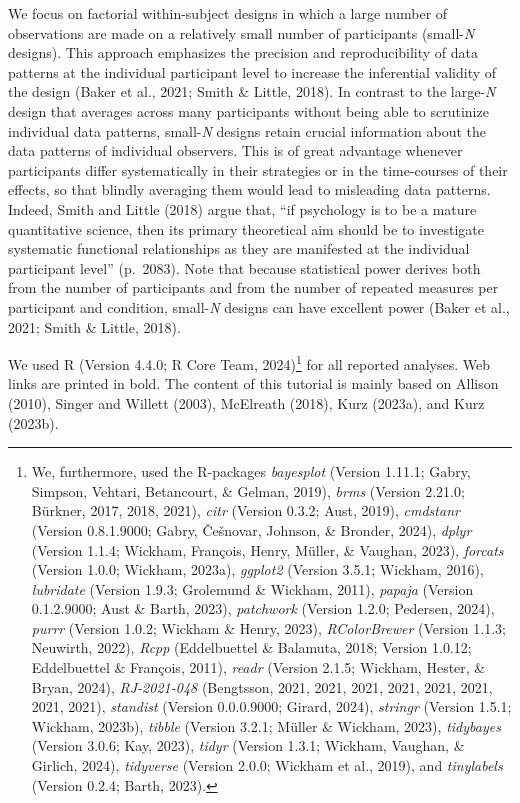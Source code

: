 \documentclass[
  man,floatsintext]{apa6}
\begin{document}
We focus on factorial within-subject designs in which a large number of observations are made on a relatively small number of participants (small-\emph{N} designs). This approach emphasizes the precision and reproducibility of data patterns at the individual participant level to increase the inferential validity of the design (Baker et al., 2021; Smith \& Little, 2018). In contrast to the large-\emph{N} design that averages across many participants without being able to scrutinize individual data patterns, small-\emph{N} designs retain crucial information about the data patterns of individual observers. This is of great advantage whenever participants differ systematically in their strategies or in the time-courses of their effects, so that blindly averaging them would lead to misleading data patterns. Indeed, Smith and Little (2018) argue that, ``if psychology is to be a mature quantitative science, then its primary theoretical aim should be to investigate systematic functional relationships as they are manifested at the individual participant level'' (p.~2083). Note that because statistical power derives both from the number of participants and from the number of repeated measures per participant and condition, small-\emph{N} designs can have excellent power (Baker et al., 2021; Smith \& Little, 2018).

We used R (Version 4.4.0; R Core Team, 2024)\footnote{We, furthermore, used the R-packages \emph{bayesplot} (Version 1.11.1; Gabry, Simpson, Vehtari, Betancourt, \& Gelman, 2019), \emph{brms} (Version 2.21.0; Bürkner, 2017, 2018, 2021), \emph{citr} (Version 0.3.2; Aust, 2019), \emph{cmdstanr} (Version 0.8.1.9000; Gabry, Češnovar, Johnson, \& Bronder, 2024), \emph{dplyr} (Version 1.1.4; Wickham, François, Henry, Müller, \& Vaughan, 2023), \emph{forcats} (Version 1.0.0; Wickham, 2023a), \emph{ggplot2} (Version 3.5.1; Wickham, 2016), \emph{lubridate} (Version 1.9.3; Grolemund \& Wickham, 2011), \emph{papaja} (Version 0.1.2.9000; Aust \& Barth, 2023), \emph{patchwork} (Version 1.2.0; Pedersen, 2024), \emph{purrr} (Version 1.0.2; Wickham \& Henry, 2023), \emph{RColorBrewer} (Version 1.1.3; Neuwirth, 2022), \emph{Rcpp} (Eddelbuettel \& Balamuta, 2018; Version 1.0.12; Eddelbuettel \& François, 2011), \emph{readr} (Version 2.1.5; Wickham, Hester, \& Bryan, 2024), \emph{RJ-2021-048} (Bengtsson, 2021, 2021, 2021, 2021, 2021, 2021, 2021, 2021), \emph{standist} (Version 0.0.0.9000; Girard, 2024), \emph{stringr} (Version 1.5.1; Wickham, 2023b), \emph{tibble} (Version 3.2.1; Müller \& Wickham, 2023), \emph{tidybayes} (Version 3.0.6; Kay, 2023), \emph{tidyr} (Version 1.3.1; Wickham, Vaughan, \& Girlich, 2024), \emph{tidyverse} (Version 2.0.0; Wickham et al., 2019), and \emph{tinylabels} (Version 0.2.4; Barth, 2023).} for all reported analyses. Web links are printed in bold. The content of this tutorial is mainly based on Allison (2010), Singer and Willett (2003), McElreath (2018), Kurz (2023a), and Kurz (2023b).
\end{document}

